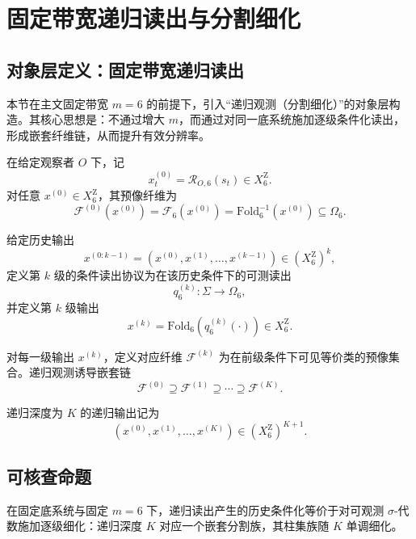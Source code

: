 \section{固定带宽递归读出与分割细化}

\subsection{对象层定义：固定带宽递归读出}

本节在主文固定带宽 $m=6$ 的前提下，引入“递归观测（分割细化）”的对象层构造。其核心思想是：不通过增大 $m$，而通过对同一底系统施加逐级条件化读出，形成嵌套纤维链，从而提升有效分辨率。

\begin{definition}[第一级输出与预像纤维]\label{def:recursive-level0}
在给定观察者 $O$ 下，记
$$
x^{(0)}_t=\mathcal{R}_{O,6}(s_t)\in X_6^{\mathrm Z}.
$$
对任意 $x^{(0)}\in X_6^{\mathrm Z}$，其预像纤维为
$$
\mathcal{F}^{(0)}(x^{(0)})=\mathcal{F}_6(x^{(0)})=\mathrm{Fold}_6^{-1}(x^{(0)})\subseteq \Omega_6.
$$
\end{definition}

\begin{definition}\label{def:recursive-conditioned-readout}
给定历史输出
$$
x^{(0:k-1)}=(x^{(0)},x^{(1)},\dots,x^{(k-1)})\in (X_6^{\mathrm Z})^{k},
$$
定义第 $k$ 级的条件读出协议为在该历史条件下的可测读出
$$
q_6^{(k)}:\Sigma\to \Omega_6,
$$
并定义第 $k$ 级输出
$$
x^{(k)}=\mathrm{Fold}_6\!\left(q_6^{(k)}(\cdot)\right)\in X_6^{\mathrm Z}.
$$
\end{definition}

\begin{definition}[嵌套纤维链]\label{def:nested-fiber-chain}
对每一级输出 $x^{(k)}$，定义对应纤维 $\mathcal{F}^{(k)}$ 为在前级条件下可见等价类的预像集合。递归观测诱导嵌套链
$$
\mathcal{F}^{(0)}\supseteq \mathcal{F}^{(1)}\supseteq \cdots \supseteq \mathcal{F}^{(K)}.
$$
\end{definition}

\begin{definition}[递归输出序列]\label{def:recursive-output-sequence}
递归深度为 $K$ 的递归输出记为
$$
(x^{(0)},x^{(1)},\dots,x^{(K)})\in (X_6^{\mathrm Z})^{K+1}.
$$
\end{definition}

\subsection{可核查命题}

\begin{proposition}[R1：递归读出等价于分割的逐级细化]\label{prop:R1-refinement}
在固定底系统与固定 $m=6$ 下，递归读出产生的历史条件化等价于对可观测 $\sigma$-代数施加逐级细化：递归深度 $K$ 对应一个嵌套分割族，其柱集族随 $K$ 单调细化。
\end{proposition}

